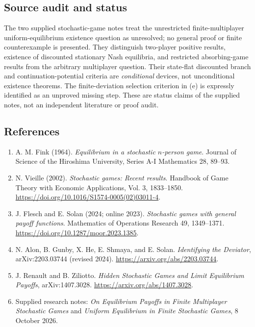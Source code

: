 \documentclass[11pt,a4paper]{article}
\begin{document}
\subsection*{Source audit and status}

The two supplied stochastic-game notes treat the unrestricted
finite-multiplayer uniform-equilibrium existence question as unresolved;
no general proof or finite counterexample is presented. They distinguish
two-player positive results, existence of discounted stationary Nash
equilibria, and restricted absorbing-game results from the arbitrary
multiplayer question. Their state-flat discounted branch and
continuation-potential criteria are \emph{conditional} devices, not
unconditional existence theorems. The finite-deviation selection
criterion in (e) is expressly identified as an unproved missing step.
These are status claims of the supplied notes, not an independent
literature or proof audit.

\subsection*{References}

\begin{enumerate}
	\item[S1] A. M. Fink (1964). \emph{Equilibrium in a stochastic
		$n$-person game}. Journal of Science of the Hiroshima University,
	Series A-I Mathematics 28, 89--93.
	\item[S2] N. Vieille (2002). \emph{Stochastic games: Recent results}.
	Handbook of Game Theory with Economic Applications, Vol. 3,
	1833--1850. \url{https://doi.org/10.1016/S1574-0005(02)03011-4}.
	\item[S3] J. Flesch and E. Solan (2024; online 2023).
	\emph{Stochastic games with general payoff functions}.
	Mathematics of Operations Research 49, 1349--1371.
	\url{https://doi.org/10.1287/moor.2023.1385}.
	\item[S4] N. Alon, B. Gunby, X. He, E. Shmaya, and E. Solan.
	\emph{Identifying the Deviator}, arXiv:2203.03744 (revised 2024).
	\url{https://arxiv.org/abs/2203.03744}.
	\item[S5] J. Renault and B. Ziliotto.
	\emph{Hidden Stochastic Games and Limit Equilibrium Payoffs},
	arXiv:1407.3028. \url{https://arxiv.org/abs/1407.3028}.
	\item[S6] Supplied research notes: \emph{On Equilibrium Payoffs in
		Finite Multiplayer Stochastic Games} and \emph{Uniform Equilibrium
		in Finite Stochastic Games}, 8 October 2026.
\end{enumerate}
\par\endgroup
\end{document}

